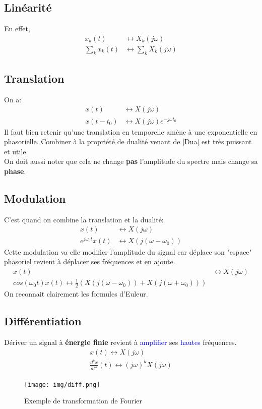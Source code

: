 \documentclass{report}
\begin{document}
\subsection{Linéarité}
En effet,
\begin{align*}
x_k(t) & \longleftrightarrow X_k(j\omega)\\
\sum_k x_k(t) & \longleftrightarrow \sum_k X_k(j\omega)
\end{align*}

\subsection{Translation}
On a:
\begin{align*}
x(t) & \longleftrightarrow X(j\omega)\\
x(t-t_0) & \longleftrightarrow X(j\omega)e^{-j \omega t_0}
\end{align*}
Il faut bien retenir qu'une translation en temporelle amène à une exponentielle en phasorielle. Combiner à la propriété de dualité venant de \ref{Dua} est très puissant et utile.\\
On doit aussi noter que cela ne change \textbf{pas} l'amplitude du spectre mais change sa \textbf{phase}.

\subsection{Modulation}
C'est quand on combine la translation et la dualité:
\begin{align*}
x(t) & \longleftrightarrow X(j\omega)\\
e^{j\omega_0 t}x(t) & \longleftrightarrow X(j(\omega - \omega_0))
\end{align*}
Cette modulation va elle modifier l'amplitude du signal car déplace son "espace" phasoriel revient à déplacer ses fréquences et en ajoute.
\begin{align*}
x(t) & \longleftrightarrow X(j\omega)\\
cos(\omega_0 t)x(t) \longleftrightarrow \frac{1}{2}(X(j(\omega - \omega_0)) + X(j(\omega + \omega_0))) 
\end{align*}
On reconnait clairement les formules d'Euleur.

\subsection{Différentiation}
Dériver un signal à \textbf{énergie finie} revient à \textcolor{blue}{amplifier} ses \textcolor{blue}{hautes} fréquences.
\begin{align*}
x(t) \longleftrightarrow X(j\omega)\\
\frac{d^kx}{dt^k}(t) \longleftrightarrow (j\omega)^kX(j\omega)
\end{align*}
\begin{figure}[H]
\centering
\texttt{[image: img/diff.png]}
\caption{Exemple de transformation de Fourier}
\end{figure}
\end{document}
